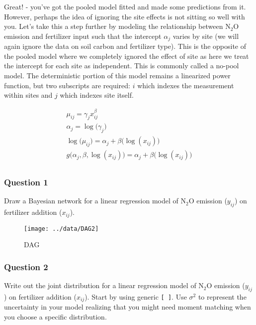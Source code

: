 \documentclass[
]{article}
\begin{document}
Great! - you've got the pooled model fitted and made some predictions
from it. However, perhaps the idea of ignoring the site effects is not
sitting so well with you. Let's take this a step further by modeling the
relationship between \(\textrm{N} _2 \textrm{O}\) emission and
fertilizer input such that the intercept \(\alpha_{j}\) varies by site
(we will again ignore the data on soil carbon and fertilizer type). This
is the opposite of the pooled model where we completely ignored the
effect of site as here we treat the intercept for each site as
independent. This is commonly called a no-pool model. The deterministic
portion of this model remains a linearized power function, but two
subscripts are required: \(i\) which indexes the measurement within
sites and \(j\) which indexes site itself.

\[
\begin{aligned}
\mu_{ij}  = \gamma_{j} x_{ij}^{\beta}\\
\alpha_{j}  = \log \bigl(\gamma_{j} \bigr)\\
\log \bigl(\mu_{ij} \bigr)  = \alpha_{j}+\beta \bigl(\log(x_{ij}) \bigr)\\
g \bigl(\alpha_{j},\beta,\log(x_{ij}) \bigr)  = \alpha_{j}+\beta \bigl(\log(x_{ij}) \bigr) \\
\end{aligned}
\]

\hypertarget{question-1-1}{%
\subsubsection{Question 1}\label{question-1-1}}

Draw a Bayesian network for a linear regression model of
\(\textrm{N} _2 \textrm{O}\) emission (\(y_{ij}\)) on fertilizer
addition (\(x_{ij}\)).

\begin{figure}

{\centering \texttt{[image: ../data/DAG2]} 

}

\caption{DAG}\label{fig:unnamed-chunk-12}
\end{figure}

\hypertarget{question-2-1}{%
\subsubsection{Question 2}\label{question-2-1}}

Write out the joint distribution for a linear regression model of
\(\textrm{N} _2 \textrm{O}\) emission (\(y_{ij}\)) on fertilizer
addition (\(x_{ij}\)). Start by using generic \texttt{{[}\ {]}}. Use
\(\sigma^{2}\) to represent the uncertainty in your model realizing that
you might need moment matching when you choose a specific distribution.
\end{document}

